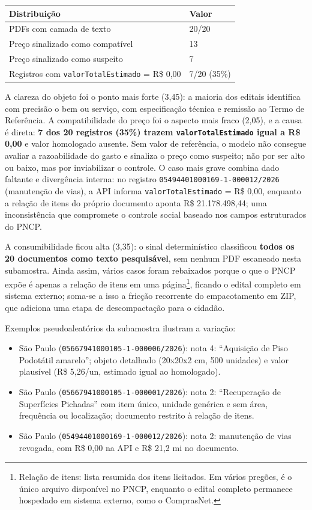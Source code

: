 \documentclass[12pt]{article}
\newcounter{none}
\providecommand{\tightlist}{%
  \setlength{\itemsep}{0pt}\setlength{\parskip}{0pt}}
\begin{document}
{\def\LTcaptype{none} %
\begin{longtable}[]{@{}ll@{}}
\toprule\noalign{}
Distribuição & Valor \\
\midrule\noalign{}
\endhead
\bottomrule\noalign{}
\endlastfoot
PDFs com camada de texto & 20/20 \\
Preço sinalizado como compatível & 13 \\
Preço sinalizado como suspeito & 7 \\
Registros com \texttt{valorTotalEstimado} = R\$ 0,00 & 7/20 (35\%) \\
\end{longtable}
}

A clareza do objeto foi o ponto mais forte (3,45): a maioria dos editais
identifica com precisão o bem ou serviço, com especificação técnica e
remissão ao Termo de Referência. A compatibilidade do preço foi o
aspecto mais fraco (2,05), e a causa é direta: \textbf{7 dos 20
registros (35\%) trazem \texttt{valorTotalEstimado} igual a R\$ 0,00} e
valor homologado ausente. Sem valor de referência, o modelo não consegue
avaliar a razoabilidade do gasto e sinaliza o preço como suspeito; não
por ser alto ou baixo, mas por inviabilizar o controle. O caso mais grave
combina dado faltante e divergência interna: no registro
\texttt{05494401000169-1-000012/2026} (manutenção de vias), a API informa
\texttt{valorTotalEstimado} = R\$ 0,00, enquanto a relação de itens do
próprio documento aponta R\$ 21.178.498,44; uma inconsistência que
compromete o controle social baseado nos campos estruturados do PNCP.

A consumibilidade ficou alta (3,35): o sinal determinístico classificou
\textbf{todos os 20 documentos como texto pesquisável}, sem nenhum PDF
escaneado nesta subamostra. Ainda assim, vários casos foram rebaixados
porque o que o PNCP expõe é apenas a relação de itens em uma
página\footnote{Relação de itens: lista resumida dos itens licitados.
  Em vários pregões, é o único arquivo disponível no PNCP, enquanto o
  edital completo permanece hospedado em sistema externo, como o
  ComprasNet.}, ficando o edital completo em sistema externo; soma-se a
isso a fricção recorrente do empacotamento em ZIP, que adiciona uma etapa
de descompactação para o cidadão.

Exemplos pseudoaleatórios da subamostra ilustram a variação:

\begin{itemize}
\tightlist
\item
  São Paulo (\texttt{05667941000105-1-000006/2026}): nota 4:
  ``Aquisição de Piso Podotátil amarelo''; objeto detalhado (20x20x2 cm,
  500 unidades) e valor plausível (R\$ 5,26/un, estimado igual ao
  homologado).
\item
  São Paulo (\texttt{05667941000105-1-000001/2026}): nota 2:
  ``Recuperação de Superfícies Pichadas'' com item único, unidade
  genérica e sem área, frequência ou localização; documento restrito à
  relação de itens.
\item
  São Paulo (\texttt{05494401000169-1-000012/2026}): nota 2:
  manutenção de vias revogada, com R\$ 0,00 na API e R\$ 21,2 mi no
  documento.
\end{itemize}
\end{document}
